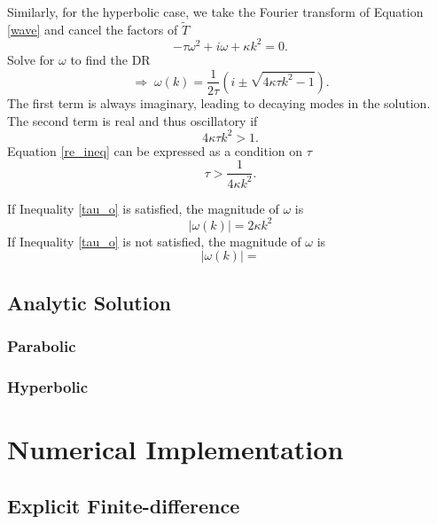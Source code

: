 \documentclass[iop]{emulateapj}
\begin{document}
				Similarly, for the hyperbolic case, we take the Fourier transform of Equation \ref{wave} and cancel the factors of $\tilde{T}$
				\begin{equation}
					- \tau \omega^2 + i \omega + \kappa k^2 = 0.
				\end{equation}
				Solve for $\omega$ to find the \ac{DR}
				\begin{equation}
					\Rightarrow \; \omega(k) = \frac{1}{2 \tau} \left( i \pm \sqrt{4 \kappa \tau k^2 - 1} \right).
				\end{equation}
				The first term is always imaginary, leading to decaying modes in the solution.
				The second term is real and thus oscillatory if 
				\begin{equation} \label{re_ineq}
					 4 \kappa \tau k^2 > 1.
				\end{equation}
				Equation \ref{re_ineq} can be expressed as a condition on $\tau$
				\begin{equation} \label{tau_o}
					\tau > \frac{1}{4 \kappa k^2}.
				\end{equation}
				
				If Inequality \ref{tau_o} is satisfied, the magnitude of $\omega$ is
				\begin{equation}
					|\omega(k)| = 2 \kappa k^2
				\end{equation}
				If Inequality \ref{tau_o} is not satisfied, the magnitude of $\omega$ is
				\begin{equation}
					|\omega(k)| = 
				\end{equation}
			
		\subsection{Analytic Solution}
			\subsubsection{Parabolic}
			\subsubsection{Hyperbolic}
	\section{Numerical Implementation}
		\subsection{Explicit Finite-difference}
\end{document}
